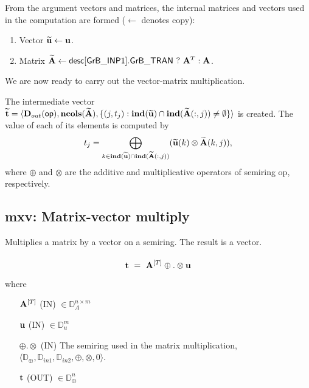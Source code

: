 From the argument vectors and matrices, the internal matrices and vectors used in 
the computation are formed ($\leftarrow$ denotes copy): 
\begin{enumerate}
	\item Vector ${\bf \widetilde{u}} \leftarrow {\bf u}$.

	\item Matrix ${\bf \widetilde{A}} \leftarrow {\sf desc[GrB\_INP1].GrB\_TRAN} \ ? \ {\bf A}^T : {\bf A}$.
\end{enumerate}



We are now ready to carry out the vector-matrix multiplication.

The intermediate vector ${\bf \widetilde{t}} = \langle
\mbox{$\mathbf{D}_{out}$}({\sf op}), \bold{ncols}({\bf \widetilde{A}}),
\{(j,t_j) : \bold{ind}({\bf \widetilde{u}}) \cap
\bold{ind}({\bf \widetilde{A}}(:,j)) \neq \emptyset \} \rangle$
is created.  The value of each of its elements is computed by 
\[t_j = \bigoplus_{k \in \bold{ind}({\bf \widetilde{u}}) \cap
\bold{ind}({\bf \widetilde{A}}(:,j))} ({\bf \widetilde{u}}(k)
\otimes {\bf \widetilde{A}}(k,j)),\] where $\oplus$ and $\otimes$
are the additive and multiplicative operators of semiring {\sf op},
respectively.



\subsection{{\sf mxv}: Matrix-vector multiply}

Multiplies a matrix by a vector on a semiring. The result is a vector.

\paragraph{\syntax}

$$
{\bf t}~ = ~ {\bf A}^{[T]} \oplus.\otimes {\bf u}
$$

where

\begin{itemize}[leftmargin=1.1in]
    \item[${\bf A}^{[T]}$]    ({\sf IN}) $\in \mathbb{D}_A^{n\times m}$

    \item[${\bf u}$]    ({\sf IN}) $\in \mathbb{D}_{u}^{m}$

    \item[$\oplus.\otimes$]   ({\sf IN}) The semiring used in the matrix
    multiplication, $\langle \mathbb{D}_\oplus, \mathbb{D}_{in1},\mathbb{D}_{in2},\oplus,\otimes,0 \rangle$.

    \item[${\bf t}$]    ({\sf OUT}) $\in \mathbb{D}_\oplus^{n}$
\end{itemize}

